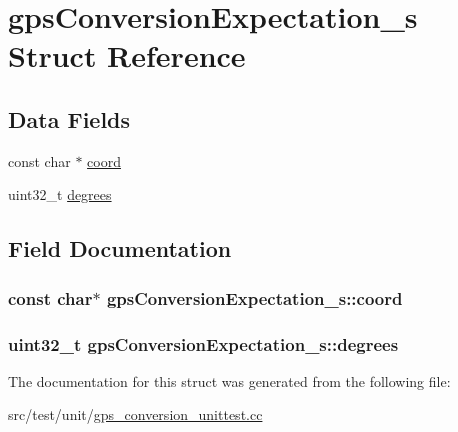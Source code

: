 \hypertarget{structgpsConversionExpectation__s}{\section{gps\+Conversion\+Expectation\+\_\+s Struct Reference}
\label{structgpsConversionExpectation__s}
}
\subsection*{Data Fields}
\begin{DoxyCompactItemize}
\item 
const char $\ast$ \hyperlink{structgpsConversionExpectation__s_a01375f6ccd3090efd2a92b98c2672661}{coord}
\item 
uint32\+\_\+t \hyperlink{structgpsConversionExpectation__s_ac054d74dea2929083b3706acbd1def2e}{degrees}
\end{DoxyCompactItemize}


\subsection{Field Documentation}
\hypertarget{structgpsConversionExpectation__s_a01375f6ccd3090efd2a92b98c2672661}{
\subsubsection[{coord}]{\setlength{\rightskip}{0pt plus 5cm}const char$\ast$ gps\+Conversion\+Expectation\+\_\+s\+::coord}}\label{structgpsConversionExpectation__s_a01375f6ccd3090efd2a92b98c2672661}
\hypertarget{structgpsConversionExpectation__s_ac054d74dea2929083b3706acbd1def2e}{
\subsubsection[{degrees}]{\setlength{\rightskip}{0pt plus 5cm}uint32\+\_\+t gps\+Conversion\+Expectation\+\_\+s\+::degrees}}\label{structgpsConversionExpectation__s_ac054d74dea2929083b3706acbd1def2e}


The documentation for this struct was generated from the following file\+:\begin{DoxyCompactItemize}
\item 
src/test/unit/\hyperlink{gps__conversion__unittest_8cc}{gps\+\_\+conversion\+\_\+unittest.\+cc}\end{DoxyCompactItemize}
